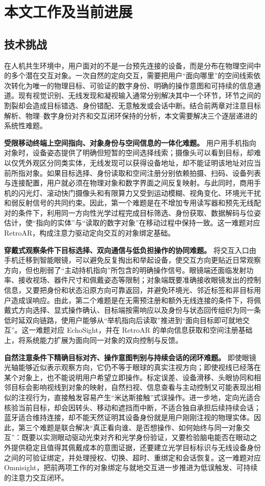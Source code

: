 \chapter{本文工作及当前进展}
\section{技术挑战}
在人机共生环境中，用户面对的不是一台预先连接的设备，而是分布在物理空间中的多个潜在交互对象。一次自然的定向交互，需要把用户“面向哪里”的空间线索依次转化为唯一的物理目标、可验证的数字身份、明确的操作意图和可持续的信息通道。现有视觉识别、无线发现和凝视输入通常分别解决其中一个环节，环节之间的割裂却会造成目标错选、身份错配、无意触发或会话中断。结合前两章对注意目标解析、物理--数字身份对齐和交互闭环保持的分析，本文需要解决三个逐层递进的系统性难题。

\textbf{受限移动终端上空间指向、对象身份与空间信息的一体化难题。} 用户用手机指向对象时，设备姿态提供了明确但短暂的空间选择线索；摄像头可以看到目标，却难以仅凭外观区分同类实体，无线发现可以获得设备地址，却不能证明该地址对应当前所指对象。如果目标选择、身份读取和空间注册分别依赖拍摄、扫码、设备列表与连接配置，用户就必须在物理对象和数字界面之间反复映射。与此同时，商用手机的闪光灯、滚动快门摄像头和有限算力又受到运动模糊、视角变化、环境光干扰和弱反射信号的共同约束。因此，第一个难题是在不增加专用读写器和预先无线配对的条件下，利用同一方向性光学过程完成目标筛选、身份获取、数据解码与位姿估计，使“指向的实体”与“读取的数字对象”在移动过程中保持一致。这一难题对应 RetroAR，构成注意力驱动定向交互的对象绑定基础。

\textbf{穿戴式观察条件下目标选择、双向通信与低负担操作的协同难题。} 将交互入口由手机迁移到智能眼镜，可以避免反复掏出和举起设备，使交互方向更贴近日常观察方向，但也削弱了“主动持机指向”所包含的明确操作信号。眼镜端还面临发射功率、接收视场、器件尺寸和佩戴姿态等限制；对象端既要准确接收眼镜发出的控制信息，又要把身份和状态沿原方向可靠返回，并避免环境光、邻近标签和非目标用户造成误响应。由此，第二个难题是在无需预注册和额外无线连接的条件下，将佩戴式方向选择、显式操作确认、目标端按需响应以及身份与状态回传组织为同一条低时延双向链路，使用户能够从“举机指向后读取”推进到“面向目标即可就地交互”。这一难题对应 EchoSight，并在 RetroAR 的单向信息获取和空间注册基础上，将系统能力扩展为面向同一对象的双向控制与反馈。

\textbf{自然注意条件下精确目标对齐、操作意图判别与持续会话的闭环难题。} 即使眼镜光轴能够近似表示观察方向，它仍不等于眼球的真实注视方向；即使视线已经落在某个对象上，也不能说明用户希望立即操作。标定误差、设备滑移、头眼协同和相邻目标会影响视线到对象的映射，自然扫视、信息查看与主动控制又可能表现出相似的注视行为，直接触发容易产生“米达斯接触”式误操作。进一步地，定向光适合核验当前目标，却会因转头、移动和遮挡而中断，不适合独自承担后续持续会话；蓝牙适合维持连接，却不能天然证明其设备身份就是用户刚刚注视的物理实体。因此，第三个难题是联合解决“真正看向谁、是否想操作、如何始终与同一对象交互”：既要以实测眼动驱动光束对齐和光学身份验证，又要检验脑电能否在眼动之外提供稳定且值得其佩戴成本的意图证据，还要建立光学目标标识与无线设备身份之间的可验证绑定，并处理授权、切换、超时、重绑定和会话恢复。这一难题对应 Omnisight，把前两项工作的对象绑定与就地交互进一步推进为低误触发、可持续的注意力交互闭环。

